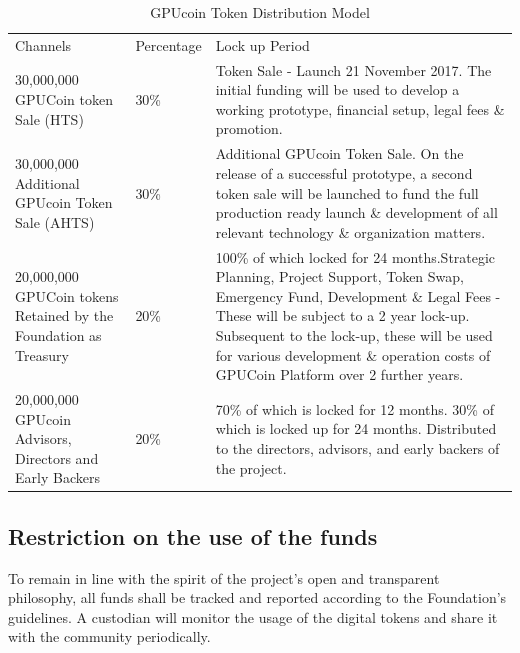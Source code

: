 \documentclass{article}
\begin{document}
\begin{table}[!htb]
\centering
\begin{tabular}{ |p{2.8cm}|p{2.5cm}|p{5cm}|}
\hline
\rowcolor{lightgray} \multicolumn{3}{|c|}{GPUcoin Token Distribution Model} \\
\hline
Channels & Percentage & Lock up Period \\
\hline
30,000,000 GPUCoin token Sale (HTS) & 30\% & Token Sale - Launch 21 November 2017. The initial funding will be used to develop a working prototype, financial setup, legal fees \& promotion.
 \\
 \hline
30,000,000 Additional GPUcoin Token Sale (AHTS) & 30\% & Additional GPUcoin Token Sale. On the release of a successful prototype, a second token sale will be launched to fund the full production ready launch \& development of all relevant technology \& organization matters.
\\
\hline
20,000,000 GPUCoin tokens Retained by the Foundation as Treasury & 20\% & 100\% of which locked for 24 months.Strategic Planning, Project Support, Token Swap, Emergency Fund, Development \& Legal Fees - These will be subject to a 2 year lock-up. Subsequent to the lock-up, these will be used for various development \& operation costs of GPUCoin Platform over 2 further years.
\\
\hline
20,000,000 GPUcoin Advisors, Directors and Early Backers & 20\% & 70\% of which is locked for 12 months. 30\% of which is locked up for 24 months. Distributed to the directors, advisors, and early backers of the
 project.
\\
 \hline
\end{tabular}
\caption{GPUcoin Token Distribution Model}
\label{table:hoot_token_distribution_model}
\end{table}

\subsection{Restriction on the use of the funds} %
\label{sub:restriction_on_the_use_of_the_funds}
To remain in line with the spirit of the project’s open and transparent philosophy, all funds shall be tracked and reported according to the Foundation’s guidelines. A custodian will monitor the usage of the digital tokens and share it with the community periodically.
\end{document}
